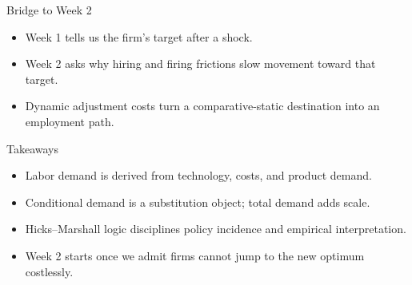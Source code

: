 \documentclass[aspectratio=169,11pt]{beamer}
\begin{document}
\begin{frame}{Bridge to Week 2}
\begin{itemize}
    \item Week 1 tells us the firm's target after a shock.
    \item Week 2 asks why hiring and firing frictions slow movement toward that target.
    \item Dynamic adjustment costs turn a comparative-static destination into an employment path.
\end{itemize}
\end{frame}

\begin{frame}{Takeaways}
\begin{itemize}
    \item Labor demand is derived from technology, costs, and product demand.
    \item Conditional demand is a substitution object; total demand adds scale.
    \item Hicks--Marshall logic disciplines policy incidence and empirical interpretation.
    \item Week 2 starts once we admit firms cannot jump to the new optimum costlessly.
\end{itemize}
\end{frame}
\end{document}
